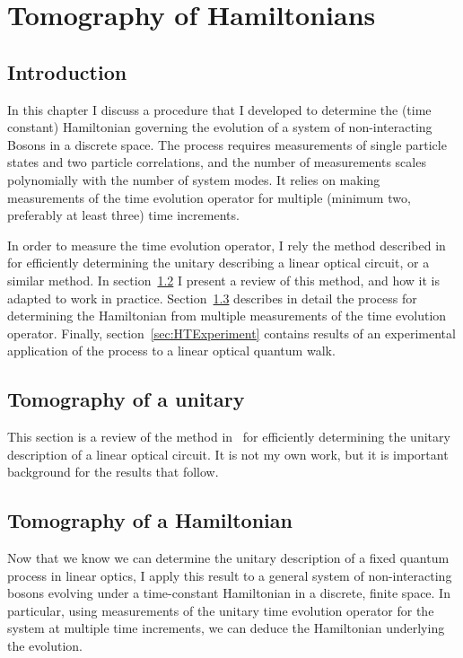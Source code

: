 \chapter{Tomography of Hamiltonians}
\label{ch:Hamiltomo}

\section{Introduction}
\label{sec:HTIntro}
In this chapter I discuss a procedure that I developed to determine the
(time constant) Hamiltonian governing the evolution of a system of
non-interacting Bosons in a discrete space. The process requires measurements of
single particle states and two particle correlations, and the number of
measurements scales polynomially with the number of system modes. It relies on
making measurements of the time evolution operator for multiple (minimum two,
preferably at least three) time increments.

In order to measure the time
evolution operator, I rely the method described in~\cite{sst} for efficiently
determining the unitary describing a linear optical circuit, or a similar
method. In section~\ref{sec:SST} I present a review of this method, and how it
is adapted to work in practice. Section~\ref{sec:Hamiltomo} describes in detail
the process for determining the Hamiltonian from multiple measurements of the
time evolution operator. Finally, section~\ref{sec:HTExperiment} contains
results of an experimental application of the process to a linear optical
quantum walk.

\section{Tomography of a unitary}
\label{sec:SST}
This section is a review of the method in~\cite{sst} for efficiently determining
the unitary description of a linear optical circuit. It is not my own work, but
it is important background for the results that follow.

\section{Tomography of a Hamiltonian}
\label{sec:Hamiltomo}
Now that we know we can determine the unitary description of a fixed quantum
process in linear optics, I apply this result to a general system of
non-interacting bosons evolving under a time-constant Hamiltonian in a discrete,
finite space. In particular, using measurements of the unitary time evolution
operator for the system at multiple time increments, we can deduce the
Hamiltonian underlying the evolution.

